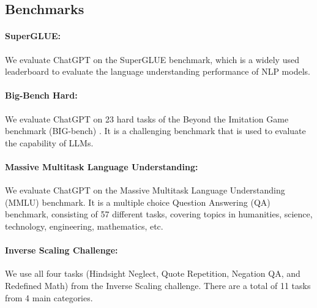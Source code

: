 \documentclass[11pt]{article}
\begin{document}
%
 
\subsection{Benchmarks}

\paragraph{SuperGLUE:}  We evaluate ChatGPT on the SuperGLUE \cite {super_glue} benchmark, which is a widely used leaderboard to evaluate the language understanding performance of NLP models. 

\paragraph{Big-Bench Hard:}  We evaluate ChatGPT on 23 hard tasks \cite{suzgun2022challenging} of the Beyond the Imitation Game benchmark (BIG-bench) \cite{srivastava2022beyond}. It is a challenging benchmark that is used to evaluate the capability of LLMs. 

\paragraph{Massive Multitask Language Understanding:} We evaluate ChatGPT on the Massive Multitask Language Understanding (MMLU) \cite{hendrycksmeasuring} benchmark. It is a multiple choice Question Answering (QA) benchmark, consisting of 57 different tasks, covering topics in humanities, science, technology, engineering, mathematics, etc.  

\paragraph{Inverse Scaling Challenge:}

We use all four tasks (Hindsight Neglect, Quote Repetition, Negation QA, and Redefined Math) from the Inverse Scaling \cite{perez_mckenzie,wei2022inverse} challenge. There are a total of 11 tasks from 4 main categories.
\end{document}
